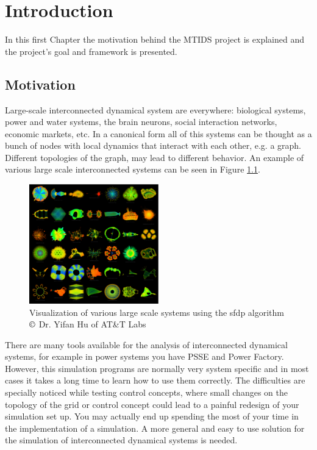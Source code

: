\documentclass[a4paper,twoside, openright,12pt]{report}
\begin{document}
\chapter{Introduction} \label{chapter1}

In this first Chapter the motivation behind the MTIDS project is explained and the project's goal and framework is presented.

\section{Motivation}
Large-scale interconnected dynamical system are everywhere: biological systems, power and water systems, the brain neurons, 
social interaction networks, economic markets, etc. In a canonical form all of this systems can be thought as a bunch of nodes with local dynamics 
that interact with each other, e.g. a graph. Different topologies of the graph, may lead to different behavior. An example of various 
large scale interconnected systems can be seen in Figure \ref{largePic}. 


\begin{figure}[htb]
\centering
\includegraphics[width=0.5\textwidth]{pics/complex.eps}
\caption[Example of large-scale systems]{Visualization of various large scale systems using the sfdp algorithm $\copyright$ Dr. Yifan Hu of AT\&T Labs}
\label{largePic}
\end{figure}

There are many tools available for the analysis of interconnected dynamical systems, for example in power systems you have PSSE and Power Factory. However,
this simulation programs are normally very system specific and in most cases it takes a long time to learn how to use them correctly. 
The difficulties are specially noticed while
testing control concepts, where small changes on the topology of the grid or control concept could lead to a painful redesign of your simulation set up. 
You may actually end up spending the most of your time in the implementation of a simulation. A more general and 
easy to use solution for the simulation of interconnected dynamical systems is needed.
\end{document}
